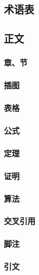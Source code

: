 \subsection{术语表}

\subsection{正文}

\subsubsection{章、节}

\subsubsection{插图}

\subsubsection{表格}

\subsubsection{公式}

\subsubsection{定理}

\subsubsection{证明}

\subsubsection{算法}

\subsubsection{交叉引用}

\subsubsection{脚注}

\subsubsection{引文}

